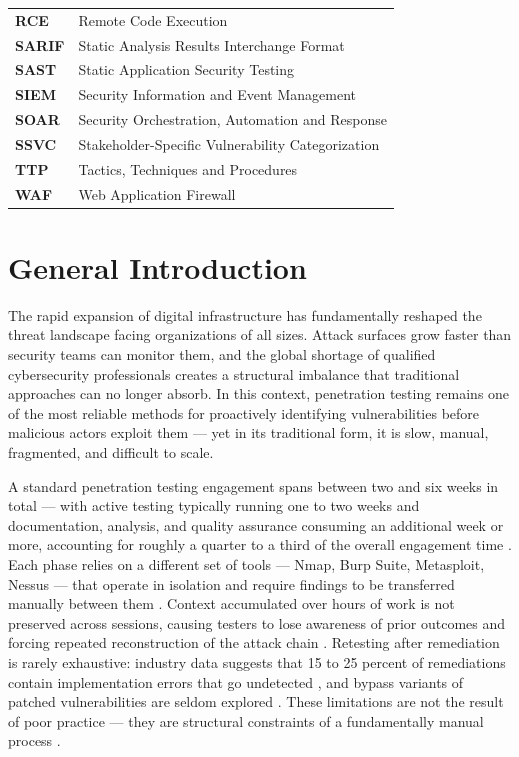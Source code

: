 \documentclass[12pt,a4paper]{report}
\begin{document}
\begin{longtable}{>{\bfseries}p{3.5cm} p{10.5cm}}
RCE         & Remote Code Execution \\
SARIF       & Static Analysis Results Interchange Format \\
SAST        & Static Application Security Testing \\
SIEM        & Security Information and Event Management \\
SOAR        & Security Orchestration, Automation and Response \\
SSVC        & Stakeholder-Specific Vulnerability Categorization \\
TTP         & Tactics, Techniques and Procedures \\
WAF         & Web Application Firewall \\
\bottomrule
\end{longtable}

\newpage
\thispagestyle{fancy}
\chapter*{General Introduction}

The rapid expansion of digital infrastructure has fundamentally reshaped the threat
landscape facing organizations of all sizes. Attack surfaces grow faster than security
teams can monitor them, and the global shortage of qualified cybersecurity professionals
creates a structural imbalance that traditional approaches can no longer absorb. In this
context, penetration testing remains one of the most reliable methods for proactively
identifying vulnerabilities before malicious actors exploit them --- yet in its traditional
form, it is slow, manual, fragmented, and difficult to scale.

\vspace{0.8cm}

A standard penetration testing engagement spans between two and six weeks in total —
with active testing typically running one to two weeks and documentation, analysis, and
quality assurance consuming an additional week or more, accounting for roughly a quarter
to a third of the overall engagement time \cite{triaxiomTimeline,valuementorLifecycle}.
Each phase relies on a different set of tools — Nmap, Burp Suite, Metasploit, Nessus —
that operate in isolation and require findings to be transferred manually between them
\cite{autosecagent2026,emazzantiTools}. Context accumulated over hours of work is not
preserved across sessions, causing testers to lose awareness of prior outcomes and
forcing repeated reconstruction of the attack chain \cite{pentestgpt2023}. Retesting
after remediation is rarely exhaustive: industry data suggests that 15 to 25 percent of
remediations contain implementation errors that go undetected \cite{hedgehogRetesting},
and bypass variants of patched vulnerabilities are seldom explored
\cite{redleggRetesting,halockVerification}. These limitations are not the result of poor
practice — they are structural constraints of a fundamentally manual process
\cite{autosecagent2026,cycognitoPentest}.
\end{document}
